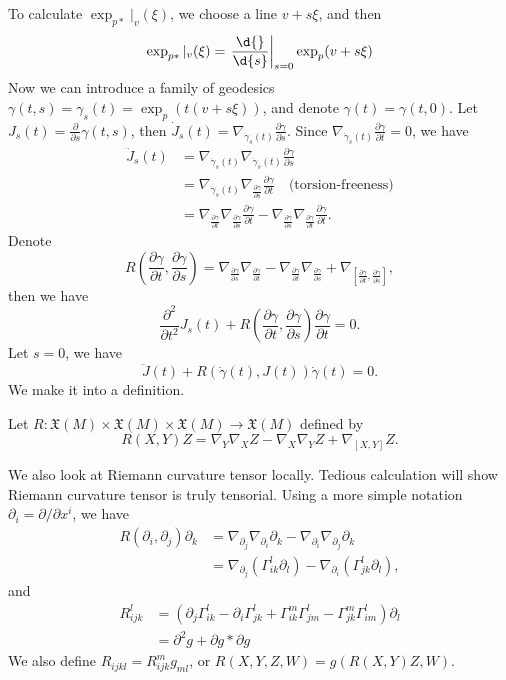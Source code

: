 To calculate $\exp_{p*}|_v(\xi)$, we choose a line $v+s\xi$, and then
\[\exp_{p*}|_v(\xi)=\left.\frac{\d{}}{\d{s}}\right|_{s=0}\exp_p(v+s\xi)\]
Now we can introduce a family of geodesics $\gamma(t,s)=\gamma_s(t)=\exp_p(t(v+s\xi))$, and denote $\gamma(t)=\gamma(t,0)$.
Let $J_s(t)=\frac{\partial{}}{\partial{s}}\gamma(t,s)$, then $\dot{J}_s(t)=\nabla_{\dot{\gamma}_s(t)}\frac{\partial{\gamma}}{\partial{s}}$.
Since $\nabla_{\dot{\gamma}_s(t)}\frac{\partial{\gamma}}{\partial{t}}=0$, we have
\begin{align*}
    \ddot{J}_s(t)&=\nabla_{\dot{\gamma}_s(t)}\nabla_{\dot{\gamma}_s(t)}\frac{\partial{\gamma}}{\partial{s}}\\
    &=\nabla_{\dot{\gamma}_s(t)}\nabla_{\frac{\partial{\gamma}}{\partial{s}}}\frac{\partial{\gamma}}{\partial{t}}\quad\text{(torsion-freeness)}\\
    &=\nabla_{\frac{\partial{\gamma}}{\partial{t}}}\nabla_{\frac{\partial{\gamma}}{\partial{s}}}\frac{\partial{\gamma}}{\partial{t}}-\nabla_{\frac{\partial{\gamma}}{\partial{s}}}\nabla_{\frac{\partial{\gamma}}{\partial{t}}}\frac{\partial{\gamma}}{\partial{t}}.
\end{align*}
Denote
\[R\left(\frac{\partial{\gamma}}{\partial{t}},\frac{\partial{\gamma}}{\partial{s}}\right)=\nabla_{\frac{\partial{\gamma}}{\partial{s}}}\nabla_{\frac{\partial{\gamma}}{\partial{t}}}-\nabla_{\frac{\partial{\gamma}}{\partial{t}}}\nabla_{\frac{\partial{\gamma}}{\partial{s}}}+\nabla_{\left[\frac{\partial{\gamma}}{\partial t},\frac{\partial{\gamma}}{\partial{s}}\right]},\]
then we have
\[\frac{\partial^2{}}{\partial{t^2}}J_s(t)+R\left(\frac{\partial{\gamma}}{\partial{t}},\frac{\partial{\gamma}}{\partial{s}}\right)\frac{\partial{\gamma}}{\partial{t}}=0.\]
Let $s=0$, we have
\[\ddot{J}(t)+R(\dot{\gamma}(t),J(t))\dot{\gamma}(t)=0.\]
We make it into a definition.

\begin{defn}
    Let $R:\mathfrak{X}(M)\times\mathfrak{X}(M)\times\mathfrak{X}(M)\to\mathfrak{X}(M)$ defined by
    \[R(X,Y)Z=\nabla_Y\nabla_XZ-\nabla_X\nabla_YZ+\nabla_{[X,Y]}Z.\]
\end{defn}

We also look at Riemann curvature tensor locally.
Tedious calculation will show Riemann curvature tensor is truly tensorial.
Using a more simple notation $\partial_i=\partial{}/\partial{x^i}$, we have
\begin{align*}
    R(\partial_i,\partial_j)\partial_k&=\nabla_{\partial_j}\nabla_{\partial_i}\partial_k-\nabla_{\partial_i}\nabla_{\partial_j}\partial_k\\
    &=\nabla_{\partial_j}(\Gamma^l_{ik}\partial_l)-\nabla_{\partial_i}(\Gamma^l_{jk}\partial_l),
\end{align*}
and
\begin{align*}
    R_{ijk}^l&=(\partial_j\Gamma^l_{ik}-\partial_i\Gamma^l_{jk}+\Gamma^m_{ik}\Gamma^l_{jm}-\Gamma^m_{jk}\Gamma^l_{im})\partial_l\\
    &=\partial^2g+\partial g*\partial g
\end{align*}
We also define $R_{ijkl}=R_{ijk}^mg_{ml}$, or $R(X,Y,Z,W)=g(R(X,Y)Z,W)$.

